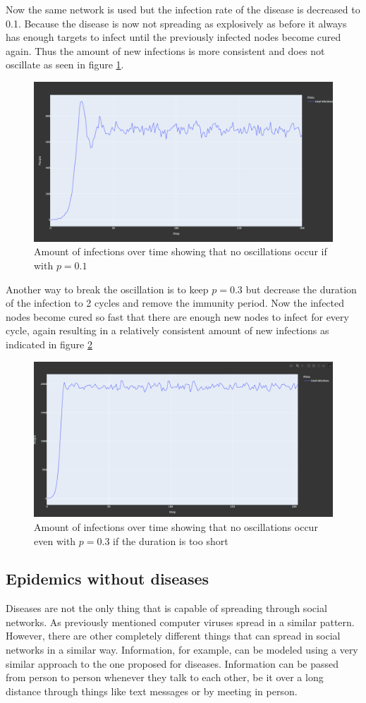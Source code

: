 Now the same network is used but the infection rate of the disease is decreased to 0.1.
Because the disease is now not spreading as explosively as before it always has enough targets
to infect until the previously infected nodes become cured again. Thus the amount of new 
infections is more consistent and does not oscillate as seen in figure \ref{fig:no_oscillation}.

\begin{figure}
    \centering
    \includegraphics[width=0.5\linewidth]{images/no_oscillation.png}
    \caption{Amount of infections over time showing that no oscillations occur if with $p = 0.1$}
    \label{fig:no_oscillation}
\end{figure}

Another way to break the oscillation is to keep $p=0.3$ but decrease the duration of the infection to 2 cycles 
and remove the immunity period. Now the infected nodes become cured so fast that there are
enough new nodes to infect for every cycle, again resulting in a relatively consistent
amount of new infections as indicated in figure \ref{fig:no_oscillation2}

\begin{figure}
    \centering
    \includegraphics[width=0.5\linewidth]{images/no_oscillation2.png}
    \caption{Amount of infections over time showing that no oscillations occur even with $p = 0.3$ if the duration is too short}
    \label{fig:no_oscillation2}
\end{figure}

\subsection{Epidemics without diseases}
Diseases are not the only thing that is capable of spreading through social networks. As
previously mentioned computer viruses spread in a similar pattern. However, there are other
completely different things that can spread in social networks in a similar way.
Information, for example, can be modeled using a very similar approach to the one proposed
for diseases. Information can be passed from person to person whenever they talk to each other,
be it over a long distance through things like text messages or by meeting in person.

